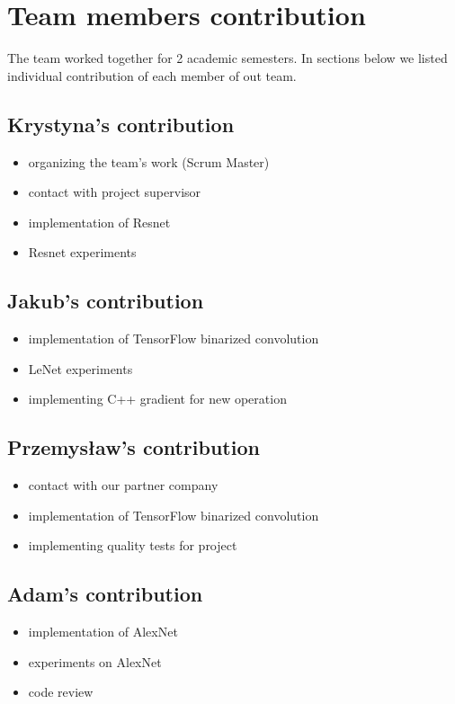 \documentclass[licencjacka]{pracamgr}
\begin{document}
	\chapter{Team members contribution}
	The team worked together for 2 academic semesters. In sections below we listed individual contribution of each member of out team.
	\section{Krystyna's contribution}
		\begin{itemize}
			\item organizing the team's work (Scrum Master)
			\item contact with project supervisor
			\item implementation of Resnet
			\item Resnet experiments
		\end{itemize}
	\section{Jakub's contribution}
		\begin{itemize}
			\item implementation of TensorFlow binarized convolution
			\item LeNet experiments
			\item implementing C++ gradient for new operation
		\end{itemize}
	\section{Przemysław's contribution}
		\begin{itemize}
			\item contact with our partner company
			\item implementation of TensorFlow binarized convolution
			\item implementing quality tests for project
		\end{itemize}
	\section{Adam's contribution}
		\begin{itemize}
			\item implementation of AlexNet
			\item experiments on AlexNet
			\item code review 
		\end{itemize}
\end{document}
